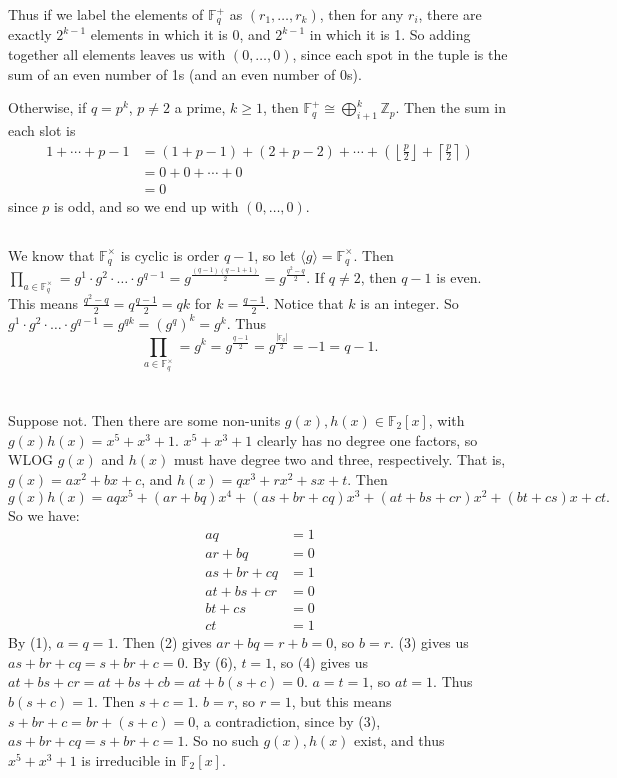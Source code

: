 \documentclass[11pt]{article}
\begin{document}
Thus if we label the elements of $\mathbb{F}_q^+$ as $(r_1,\ldots,r_k)$, then for any $r_i$, there are exactly $2^{k-1}$ elements in which it is 0, and $2^{k-1}$ in which it is 1.
So adding together all elements leaves us with $(0,\ldots,0)$, since each spot in the tuple is the sum of an even number of 1s (and an even number of 0s).

Otherwise, if $q=p^k$, $p\neq2$ a prime, $k\ge1$, then $\mathbb{F}_q^+\cong\bigoplus_{i+1}^k\mathbb{Z}_p$.
Then the sum in each slot is
\begin{align*}
	1+\cdots+p-1&=(1+p-1)+(2+p-2)+\cdots+\left(\left\lfloor\frac{p}{2}\right\rfloor+\left\lceil\frac{p}{2}\right\rceil\right)\\
	&=0+0+\cdots+0\\
	&=0
\end{align*}
since $p$ is odd, and so we end up with $(0,\ldots,0)$.


\subsection{} %
We know that $\mathbb{F}_q^\times$ is cyclic is order $q-1$, so let $\langle g\rangle=\mathbb{F}_q^\times$.
Then $\prod_{a\in\mathbb{F}_q^\times}=g^1\cdot g^2\cdot\ldots\cdot g^{q-1}=g^\frac{(q-1)(q-1+1)}{2}=g^\frac{q^2-q}{2}$.
If $q\neq2$, then $q-1$ is even. This means $\frac{q^2-q}{2}=q\frac{q-1}{2}=qk$ for $k=\frac{q-1}{2}$.
Notice that $k$ is an integer.
So $g^1\cdot g^2\cdot\ldots\cdot g^{q-1}=g^{qk}=(g^q)^k=g^k$.
Thus
\[\prod_{a\in\mathbb{F}_q^\times}=g^k=g^\frac{q-1}{2}=g^\frac{\left|\mathbb{F}_q\right|}{2}=-1=q-1.\]


\section{} %
\subsection{} %
Suppose not.
Then there are some non-units $g(x),h(x)\in\mathbb{F}_2\left[x\right]$, with $g(x)h(x)=x^5+x^3+1$.
$x^5+x^3+1$ clearly has no degree one factors, so WLOG $g(x)$ and $h(x)$ must have degree two and three, respectively.
That is, $g(x)=ax^2+bx+c$, and $h(x)=qx^3+rx^2+sx+t$.
Then
\[g(x)h(x)=aqx^5+(ar+bq)x^4+(as+br+cq)x^3+(at+bs+cr)x^2+(bt+cs)x+ct.\]
So we have:
\begin{align}
	aq&=1\\
	ar+bq&=0\\
	as+br+cq&=1\\
	at+bs+cr&=0\\
	bt+cs&=0\\
	ct&=1
\end{align}
By (1), $a=q=1$.
Then (2) gives $ar+bq=r+b=0$, so $b=r$.
(3) gives us $as+br+cq=s+br+c=0$.
By (6), $t=1$, so (4) gives us $at+bs+cr=at+bs+cb=at+b(s+c)=0$.
$a=t=1$, so $at=1$. Thus $b(s+c)=1$.
Then $s+c=1$.
$b=r$, so $r=1$, but this means $s+br+c=br+(s+c)=0$, a contradiction, since by (3), $as+br+cq=s+br+c=1$.
So no such $g(x),h(x)$ exist, and thus $x^5+x^3+1$ is irreducible in $\mathbb{F}_2\left[x\right]$.
\end{document}
